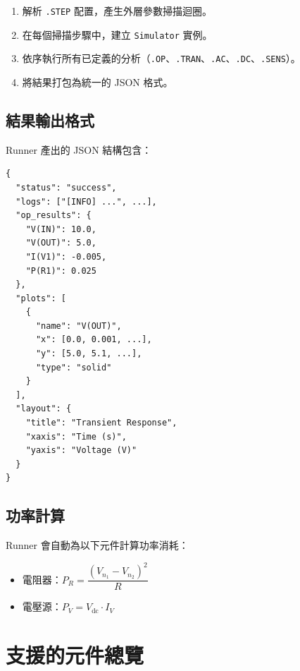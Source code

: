 \documentclass[12pt,a4paper]{article}
\begin{document}
\begin{enumerate}
  \item 解析 \texttt{.STEP} 配置，產生外層參數掃描迴圈。
  \item 在每個掃描步驟中，建立 \texttt{Simulator} 實例。
  \item 依序執行所有已定義的分析（\texttt{.OP}、\texttt{.TRAN}、\texttt{.AC}、\texttt{.DC}、\texttt{.SENS}）。
  \item 將結果打包為統一的 JSON 格式。
\end{enumerate}

\subsection{結果輸出格式}

Runner 產出的 JSON 結構包含：

\begin{lstlisting}[language={},caption={輸出結構}]
{
  "status": "success",
  "logs": ["[INFO] ...", ...],
  "op_results": {
    "V(IN)": 10.0,
    "V(OUT)": 5.0,
    "I(V1)": -0.005,
    "P(R1)": 0.025
  },
  "plots": [
    {
      "name": "V(OUT)",
      "x": [0.0, 0.001, ...],
      "y": [5.0, 5.1, ...],
      "type": "solid"
    }
  ],
  "layout": {
    "title": "Transient Response",
    "xaxis": "Time (s)",
    "yaxis": "Voltage (V)"
  }
}
\end{lstlisting}

\subsection{功率計算}

Runner 會自動為以下元件計算功率消耗：

\begin{itemize}
  \item 電阻器：$P_R = \dfrac{(V_{n_1} - V_{n_2})^2}{R}$
  \item 電壓源：$P_V = V_{\text{dc}} \cdot I_{V}$
\end{itemize}


\section{支援的元件總覽}
\end{document}
